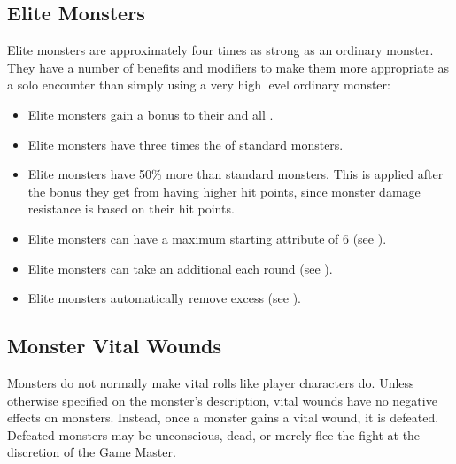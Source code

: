     \subsection{Elite Monsters}\label{Elite Monsters}
        Elite monsters are approximately four times as strong as an ordinary monster.
        They have a number of benefits and modifiers to make them more appropriate as a solo encounter than simply using a very high level ordinary monster:
        \begin{itemize}
            \item Elite monsters gain a  bonus to their  and all .
            \item Elite monsters have three times the  of standard monsters.
            \item Elite monsters have 50\% more  than standard monsters. This is applied after the bonus they get from having higher hit points, since monster damage resistance is based on their hit points.
            \item Elite monsters can have a maximum starting attribute of 6 (see ).
            \item Elite monsters can take an additional  each round (see ).
            \item Elite monsters automatically remove excess  (see ).
        \end{itemize}

        \subsection{Monster Vital Wounds}
            Monsters do not normally make vital rolls like player characters do.
            Unless otherwise specified on the monster's description, vital wounds have no negative effects on monsters.
            Instead, once a monster gains a vital wound, it is defeated.
            Defeated monsters may be unconscious, dead, or merely flee the fight at the discretion of the Game Master.


